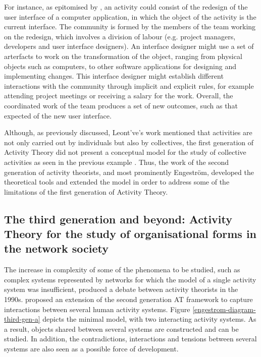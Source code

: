 For instance, as epitomised by \textcite{kaptelinin2012}, an activity could consist of the redesign of the user interface of a computer application, in which the object of the activity is the current interface. The community is formed by the members of the team working on the redesign, which involves a division of labour (e.g. project managers, developers and user interface designers). An interface designer might use a set of arterfacts to work on the transformation of the object, ranging from physical objects such as computers, to other software applications for designing and implementing changes. This interface designer might establish different interactions with the community through implicit and explicit rules, for example attending project meetings or receiving a salary for the work. Overall, the coordinated work of the team produces a set of new outcomes, such as that expected of the new user interface.

Although, as previously discussed, Leont've's work mentioned that activities are not only carried out by individuals but also by collectives, the first generation of Activity Theory did not present a conceptual model for the study of collective activities as seen in the previous example \parencite{kaptelinin2012}. Thus, the work of the second generation of activity theorists, and most prominently Engestr{\"o}m, developed the theoretical tools and extended the model in order to address some of the limitations of the first generation of Activity Theory. 

\subsection{The third generation and beyond: Activity Theory for the study of organisational forms in the network society}
\label{subsec:3at}

The increase in complexity of some of the phenomena to be studied, such as complex systems represented by networks for which the model of a single activity system was insufficient, produced a debate between activity theorists in the 1990s. \textcite{engestrom199923} proposed an extension of the second generation AT framework to capture interactions between several human activity systems. Figure \ref{engestrom-diagram-third-gen-a} depicts the minimal model, with two interacting activity systems. As a result, objects shared between several systems are constructed and can be studied. In addition, the contradictions, interactions and tensions between several systems are also seen as a possible force of development.

